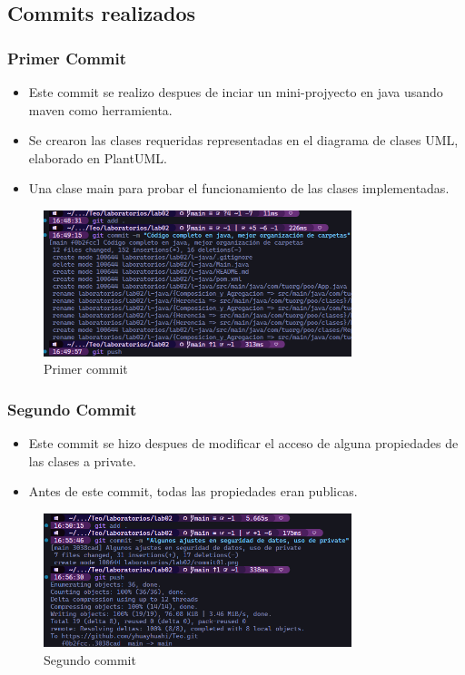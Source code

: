 \subsection {Commits realizados}

\subsubsection {Primer Commit}

\begin{itemize}
    \item Este commit se realizo despues de inciar un mini-projyecto en java usando maven como herramienta.
    \item Se crearon las clases requeridas representadas en el diagrama de clases UML, elaborado en PlantUML.
    \item Una clase main para probar el funcionamiento de las clases implementadas.
\end{itemize}

\begin{figure}[H]
    \centering
    \includegraphics[width=0.8\textwidth]{img/commit01.png}
    \caption{Primer commit}
\end{figure}


\subsubsection {Segundo Commit}

\begin{itemize}
    \item Este commit se hizo despues de modificar el acceso de alguna propiedades de las clases a private.
    \item Antes de este commit, todas las propiedades eran publicas.
\end{itemize}

\begin{figure}[H]
    \centering
    \includegraphics[width=0.8\textwidth]{img/commit02.png}
    \caption{Segundo commit}
\end{figure}


